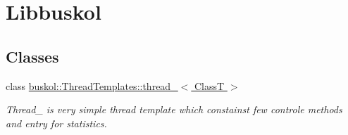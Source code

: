 \hypertarget{group__libbuskol}{
\section{Libbuskol}
\label{group__libbuskol}
}
\subsection*{Classes}
\begin{DoxyCompactItemize}
\item 
class \hyperlink{classbuskol_1_1ThreadTemplates_1_1thread__1}{buskol::ThreadTemplates::thread\_$<$ ClassT $>$}
\begin{DoxyCompactList}\small\item\em Thread\_ is very simple thread template which constainst few controle methods and entry for statistics. \item\end{DoxyCompactList}\end{DoxyCompactItemize}
